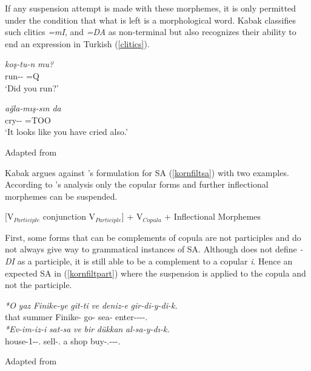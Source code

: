 If any suspension attempt is made with these morphemes, it is only permitted under the condition that what is left is a morphological word. Kabak classifies such clitics \textit{=mI}, and \textit{=DA} as non-terminal but also recognizes their ability to end an expression in Turkish (\ref{clitics}).

\begin{exe}
    \ex \label{clitics}
    \begin{xlist}
    \begin{multicols}{2}
        \ex
        \gll
        \textit{koş-tu-n} \textit{mu?} \\ run-{{\Pst}}-{\Second}{\Sg} =Q \\
        \glt `Did you run?'
        
        \ex 
        \gll
        \textit{ağla-mış-sın} \textit{da} \\ cry-{\Evi}-{\Second}{\Sg} =TOO \\ 
        \glt `It looks like you have cried also.'
    \end{multicols}
    \end{xlist}
    \hfill Adapted from \cite{kabak2007turkish}
\end{exe}
Kabak argues against \cite{kornfilt1996some}'s formulation for SA (\ref{kornfiltsa}) with two examples. According to \cite{kornfilt1996some}'s analysis only the copular forms and further inflectional morphemes can be suspended.
\begin{exe}
    \ex \label{kornfiltsa}
    [V$_{Participle}$ conjunction V$_{Participle}$] + V$_{Copula}$ + Inflectional Morphemes
\end{exe}

First, some forms that can be complements of copula are not participles and do not always give way to grammatical instances of SA. Although \cite{kornfilt1996some} does not define \textit{-DI} as a participle, it is still able to be a complement to a copular \textit{i}. Hence an expected SA in (\ref{kornfiltpart}) where the suspension is applied to the copula and not the participle.

\begin{exe}
    \ex \label{kornfiltpart}
    \begin{xlist}
        \ex
        \gll
        \textit{*O} \textit{yaz} \textit{Finike-ye} \textit{git-ti} \textit{ve} \textit{deniz-e} \textit{gir-di-y-di-k.} \\ that summer Finike-{\Dat} go-{{\Pst}} {\And} sea-{\Dat} enter-{{\Pst}}-{\Cop}-{{\Pst}}-{\First}.{\Pl} \\
        
        \ex 
        \gll 
        \textit{*Ev-im-iz-i} \textit{sat-sa} \textit{ve} \textit{bir} \textit{dükkan} \textit{al-sa-y-dı-k.} \\ house-1-{\Pl}-{\Acc}. sell-{\Cond}. {\And} a shop buy-{\Cond}.-{\Cop}-{{\Pst}}-{\First}.{\Pl} \\
    \end{xlist}
\hfill Adapted from \cite{kabak2007turkish}
\end{exe}

